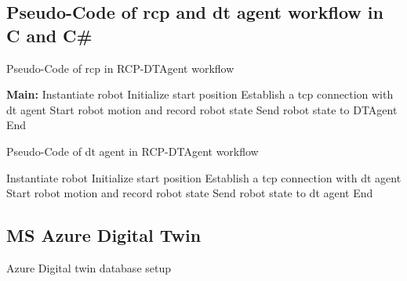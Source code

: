 \subsection{Pseudo-Code of \gls{rcp} and \gls{dt} agent workflow in C\+\+ and C\#}
\begin{minipage}{0.49\textwidth}
\begin{algorithm}[H]
    \caption{Pseudo-Code of \gls{rcp} in RCP-DTAgent workflow}
    \label{alg:RCPPseudoCode}
    \begin{algorithmic}
    \State \textbf{Main:}
    \State \qquad Instantiate robot
    \State \qquad Initialize start position
    \State \qquad Establish a \gls{tcp} connection with \gls{dt} agent  
    \State \qquad Start robot motion and record robot state
    \State \qquad Send robot state to DTAgent 
    \State \qquad End
    \end{algorithmic}
\end{algorithm}
\end{minipage}
\hfill
\begin{minipage}{0.49\textwidth}
    \begin{algorithm}[H]
        \caption{Pseudo-Code of \gls{dt} agent in RCP-DTAgent workflow}
        \label{alg:DTAgentPseudoCode}
        \begin{algorithmic}
        \State Instantiate robot
        \State Initialize start position
        \State Establish a \gls{tcp} connection with \gls{dt} agent  
        \State Start robot motion and record robot state
        \State Send robot state to \gls{dt} agent 
        \State End
        \end{algorithmic}
    \end{algorithm}
    \end{minipage}


\subsection{MS Azure Digital Twin}
Azure Digital twin database setup